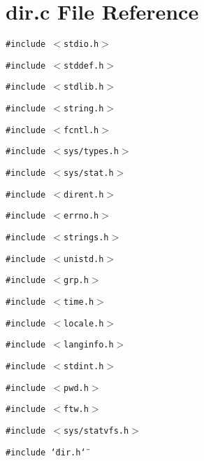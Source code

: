 \section{dir.c File Reference}
\label{dir_8c}
{\tt \#include $<$stdio.h$>$}\par
{\tt \#include $<$stddef.h$>$}\par
{\tt \#include $<$stdlib.h$>$}\par
{\tt \#include $<$string.h$>$}\par
{\tt \#include $<$fcntl.h$>$}\par
{\tt \#include $<$sys/types.h$>$}\par
{\tt \#include $<$sys/stat.h$>$}\par
{\tt \#include $<$dirent.h$>$}\par
{\tt \#include $<$errno.h$>$}\par
{\tt \#include $<$strings.h$>$}\par
{\tt \#include $<$unistd.h$>$}\par
{\tt \#include $<$grp.h$>$}\par
{\tt \#include $<$time.h$>$}\par
{\tt \#include $<$locale.h$>$}\par
{\tt \#include $<$langinfo.h$>$}\par
{\tt \#include $<$stdint.h$>$}\par
{\tt \#include $<$pwd.h$>$}\par
{\tt \#include $<$ftw.h$>$}\par
{\tt \#include $<$sys/statvfs.h$>$}\par
{\tt \#include \char`\"{}dir.h\char`\"{}}\par
